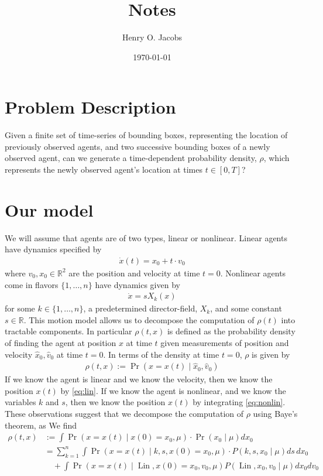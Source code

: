 \documentclass[12pt]{amsart}
\title{Notes}
\author{Henry O. Jacobs}
\date{\today}
\DeclareMathOperator{\Lin}{Lin}
\begin{document}
\maketitle
\tableofcontents

\section{Problem Description}
Given a finite set of time-series of bounding boxes, representing the location of previously observed agents, and
two successive bounding boxes of a newly observed agent, can we generate a time-dependent probability density, $\rho$, which represents the
newly observed agent's location at times $t \in [0, T]$?

\section{Our model}
We will assume that agents are of two types, linear or nonlinear.  Linear agents have dynamics specified by
\begin{align}
	\dot{x} (t)= x_0 + t \cdot v_0 \label{eq:lin}
\end{align}
where $v_0, x_0 \in \mathbb{R}^2$ are the position and velocity at time $t=0$.
Nonlinear agents come in flavors $\{1,\dots,n\}$ have dynamics given by
\begin{align}
	\dot{x} = s X_k(x) \label{eq:nonlin}
\end{align}
for some $k \in \{1,\dots,n\}$, a predetermined director-field, $X_k$, and some constant $s \in \mathbb{R}$.
This motion model allows us to decompose the computation of $\rho(t)$ into tractable components.
In particular $\rho(t,x)$ is defined as the probability density of finding the agent at position $x$ at time $t$ given measurements of position and velocity $\hat{x}_0, \hat{v}_0$ at time $t=0$.
In terms of the density at time $t=0$, $\rho$ is given by
\begin{align*}
	\rho(t,x ) := \Pr( x = x(t)\mid \hat{x}_0, \hat{v}_0 )
\end{align*}
If we know the agent is linear and we know the velocity, then we know the position $x(t)$ by \eqref{eq:lin}.
If we know the agent is nonlinear, and we know the variables $k$ and $s$, then we know the position $x(t)$ by integrating \eqref{eq:nonlin}.
These observations suggest that we decompose the computation of $\rho$ using Baye's theorem, as
We find
\begin{align*}
	\rho(t,x ) &:= \int \Pr( x = x(t) \mid x(0) = x_0, \mu ) \cdot \Pr(x_0 \mid \mu ) dx_0 \\
	&= \sum_{k=1}^{n} \int \Pr( x = x(t) \mid k,s, x(0) = x_0, \mu ) \cdot P( k,s,x_0 \mid \mu) ds \, dx_0 \\
	&\quad + \int \Pr(x = x(t) \mid \Lin, x(0) = x_0, v_0 , \mu ) P( \Lin, x_0, v_0  \mid \mu ) dx_0 dv_0
\end{align*}
\end{document}
